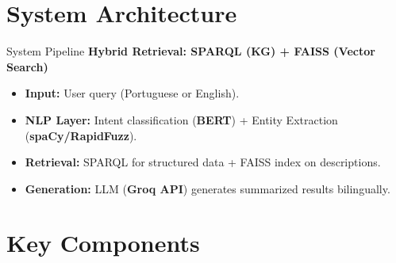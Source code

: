 \documentclass[t, 10pt, handout, aspectratio=169]{beamer}
\begin{document}
\section{System Architecture}
\begin{frame}{System Pipeline}
  \centering
  \textbf{Hybrid Retrieval: SPARQL (KG) + FAISS (Vector Search)}
  
  \vspace{0.5em}
  \begin{itemize}
    \item \textbf{Input:} User query (Portuguese or English).
    \item \textbf{NLP Layer:} Intent classification (\textbf{BERT}) + Entity Extraction (\textbf{spaCy/RapidFuzz}).
    \item \textbf{Retrieval:} SPARQL for structured data + FAISS index on descriptions.
    \item \textbf{Generation:} LLM (\textbf{Groq API}) generates summarized results bilingually.
  \end{itemize}
\end{frame}

\section{Key Components}
\end{document}
